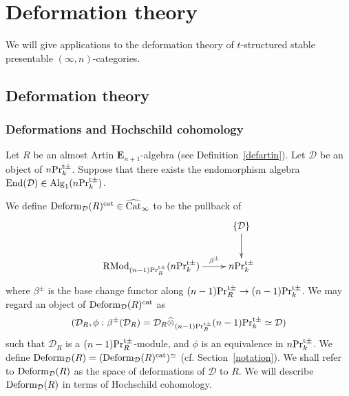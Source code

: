 \documentclass[leqno,12pt]{amsart}
\theoremstyle{plain}
\theoremstyle{definition}
\newtheorem{Remark}[Theorem]{Remark}
\newcommand{\DDD}{\mathcal{D}}
\newcommand{\PRTTT}{\textup{Pr}^{\textup{t}\pm}}
\newcommand{\OO}{{\mathcal{O}}}
\newcommand{\Spec}{\operatorname{Spec}}
\newcommand{\Map}{\operatorname{Map}}
\newcommand{\Alg}{\operatorname{Alg}}
\newcommand{\End}{\operatorname{End}}
\newcommand{\wCat}{\widehat{\textup{Cat}}_{\infty}}
\newcommand{\XX}{\mathcal{X}}
\newcommand{\RMod}{\operatorname{RMod}}
\newcommand{\Sym}{\operatorname{Sym}}
\begin{document}


\section{Deformation theory}


\label{deformsec}

We will give applications to the deformation theory of $t$-structured stable presentable $(\infty,n)$-categories.



\subsection{Deformation theory}


\subsubsection{Deformations and Hochschild cohomology}
Let $R$ be an almost Artin $\mathbf{E}_{n+1}$-algebra (see Definition~\ref{defartin}).
Let $\DDD$ be an object of $n\PRTTT_k$.
Suppose that there exists the endomorphism algebra $\End(\DDD)\in \Alg_1(n\PRTTT_k)$. 

We define $\textup{Deform}_{\DDD}(R)^{\textup{cat}}\in \wCat$ to be the pullback of
\[
\xymatrix{
   & \{\DDD\}  \ar[d] \\
\RMod_{(n-1)\PRTTT_R}(n\PRTTT_k)  \ar[r]^(0.7){\beta^\pm}  & n\PRTTT_k
}
\]
where $\beta^\pm$ is the base change functor along 
$(n-1)\PRTTT_R \to (n-1)\PRTTT_k$.
We may regard an object of  $\textup{Deform}_{\DDD}(R)^{\textup{cat}}$ as 
\[
(\DDD_R, \phi:\beta^\pm(\DDD_R)=\DDD_R\widehat{\otimes}_{(n-1)\PRTTT_R}(n-1)\PRTTT_k\simeq \DDD)
\]
such that $\DDD_R$ is a $(n-1)\PRTTT_R$-module, and $\phi$ is an equivalence in $n\PRTTT_k$.
We define $\textup{Deform}_{\DDD}(R)=(\textup{Deform}_{\DDD}(R)^{\textup{cat}})^\simeq$ (cf. Section~\ref{notation}).
We shall refer to $\textup{Deform}_{\DDD}(R)$ as the space of deformations of $\DDD$ to $R$.
We will describe $\textup{Deform}_{\DDD}(R)$  in terms of Hochschild cohomology.
\end{document}
